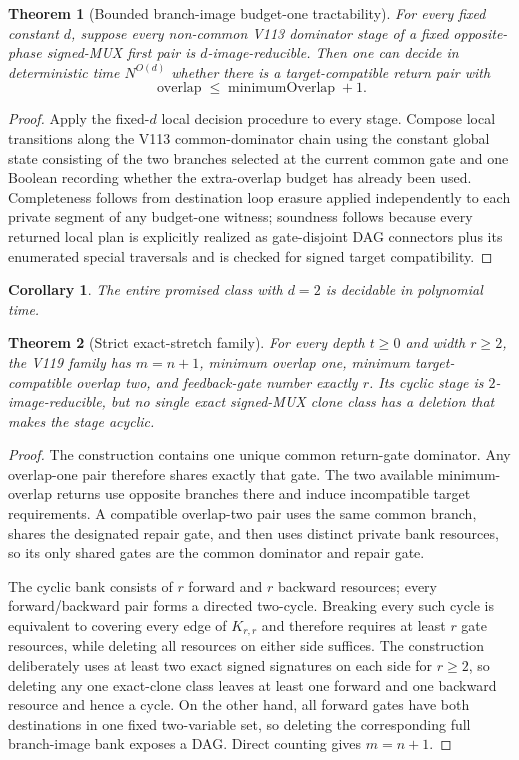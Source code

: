 \documentclass[11pt]{article}
\newtheorem{theorem}{Theorem}
\newtheorem{corollary}{Corollary}
\begin{document}
\begin{theorem}[Bounded branch-image budget-one tractability]
For every fixed constant $d$, suppose every non-common V113 dominator stage of a fixed opposite-phase signed-MUX first pair is $d$-image-reducible.  Then one can decide in deterministic time $N^{O(d)}$ whether there is a target-compatible return pair with
\[
 \operatorname{overlap}\le \operatorname{minimumOverlap}+1.
\]
\end{theorem}

\begin{proof}
Apply the fixed-$d$ local decision procedure to every stage.  Compose local transitions along the V113 common-dominator chain using the constant global state consisting of the two branches selected at the current common gate and one Boolean recording whether the extra-overlap budget has already been used.  Completeness follows from destination loop erasure applied independently to each private segment of any budget-one witness; soundness follows because every returned local plan is explicitly realized as gate-disjoint DAG connectors plus its enumerated special traversals and is checked for signed target compatibility.
\end{proof}

\begin{corollary}
The entire promised class with $d=2$ is decidable in polynomial time.
\end{corollary}

\begin{theorem}[Strict exact-stretch family]
For every depth $t\ge0$ and width $r\ge2$, the V119 family has $m=n+1$, minimum overlap one, minimum target-compatible overlap two, and feedback-gate number exactly $r$.  Its cyclic stage is $2$-image-reducible, but no single exact signed-MUX clone class has a deletion that makes the stage acyclic.
\end{theorem}

\begin{proof}
The construction contains one unique common return-gate dominator.  Any overlap-one pair therefore shares exactly that gate.  The two available minimum-overlap returns use opposite branches there and induce incompatible target requirements.  A compatible overlap-two pair uses the same common branch, shares the designated repair gate, and then uses distinct private bank resources, so its only shared gates are the common dominator and repair gate.

The cyclic bank consists of $r$ forward and $r$ backward resources; every forward/backward pair forms a directed two-cycle.  Breaking every such cycle is equivalent to covering every edge of $K_{r,r}$ and therefore requires at least $r$ gate resources, while deleting all resources on either side suffices.  The construction deliberately uses at least two exact signed signatures on each side for $r\ge2$, so deleting any one exact-clone class leaves at least one forward and one backward resource and hence a cycle.  On the other hand, all forward gates have both destinations in one fixed two-variable set, so deleting the corresponding full branch-image bank exposes a DAG.  Direct counting gives $m=n+1$.
\end{proof}
\end{document}
